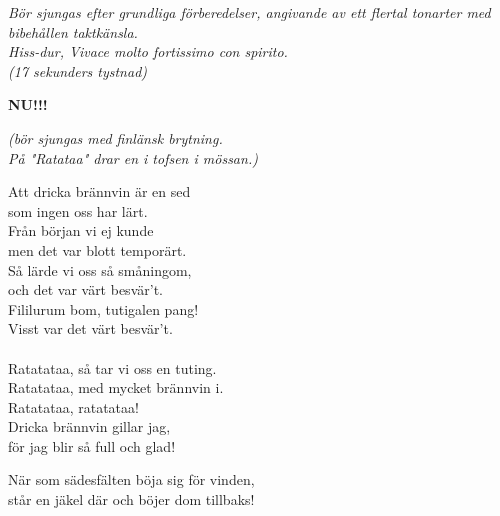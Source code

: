 \documentclass[a6paper, 10pt, twoside]{article}
\begin{document}
\noindent
\begin{center}
    \textit{\small Bör sjungas efter grundliga förberedelser, angivande av ett flertal tonarter med bibehållen taktkänsla.\\ Hiss-dur, Vivace molto fortissimo con spirito.\\
(17 sekunders tystnad)}\\
\begin{lyrics}
\Large \textbf{NU!!!}
\end{lyrics}
\end{center}
\begin{center}
    \textit{\small (bör sjungas med finlänsk brytning. \\ På "Ratataa" drar en i tofsen i mössan.)}
\end{center}
\begin{lyrics}
Att dricka brännvin är en sed \\
som ingen oss har lärt. \\
Från början vi ej kunde \\
men det var blott temporärt. \\
Så lärde vi oss så småningom, \\
och det var värt besvär't. \\
Fililurum bom, tutigalen pang! \\
Visst var det värt besvär't. \\
\vspace{5pt}\\
Ratatataa, så tar vi oss en tuting. \\
Ratatataa, med mycket brännvin i. \\
Ratatataa, ratatataa! \\
Dricka brännvin gillar jag, \\
för jag blir så full och glad! 
\end{lyrics}
\begin{center}
\end{center}
\begin{lyrics}
När som sädesfälten böja sig för vinden, \\
står en jäkel där och böjer dom tillbaks! 
\end{lyrics}
\end{document}
